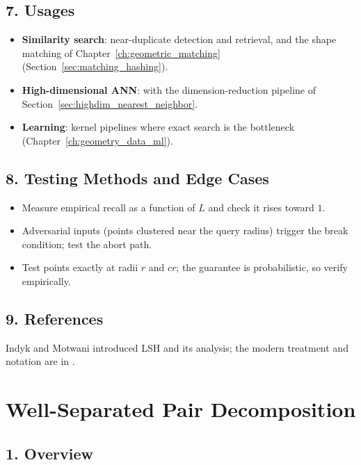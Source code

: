 \subsection{7. Usages}

\begin{itemize}
\item \textbf{Similarity search}: near-duplicate detection and retrieval,
  and the shape matching of Chapter~\ref{ch:geometric_matching}
  (Section~\ref{sec:matching_hashing}).
\item \textbf{High-dimensional ANN}: with the dimension-reduction pipeline
  of Section~\ref{sec:highdim_nearest_neighbor}.
\item \textbf{Learning}: kernel pipelines where exact search is the
  bottleneck (Chapter~\ref{ch:geometry_data_ml}).
\end{itemize}

\subsection{8. Testing Methods and Edge Cases}

\begin{itemize}
\item Measure empirical recall as a function of $L$ and check it rises
  toward $1$.
\item Adversarial inputs (points clustered near the query radius) trigger
  the break condition; test the abort path.
\item Test points exactly at radii $r$ and $cr$; the guarantee is
  probabilistic, so verify empirically.
\end{itemize}

\subsection{9. References}

Indyk and Motwani \cite{indyk1998} introduced LSH and its analysis; the
modern treatment and notation are in \cite{harpeled2011}.


\section{Well-Separated Pair Decomposition}
\label{sec:approx_wsd}

\subsection{1. Overview}


